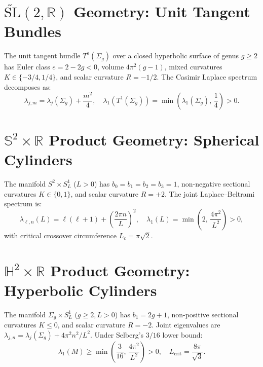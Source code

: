\documentclass[11pt,a4paper]{article}
\begin{document}
\section{$\widetilde{\mathrm{SL}}(2, \mathbb{R})$ Geometry: Unit Tangent Bundles}
The unit tangent bundle $T^1(\Sigma_g)$ over a closed hyperbolic surface of genus $g \ge 2$ has Euler class $e = 2-2g < 0$, volume $4\pi^2(g-1)$, mixed curvatures $K \in \{-3/4, 1/4\}$, and scalar curvature $R = -1/2$. The Casimir Laplace spectrum decomposes as:
\begin{equation}
\lambda_{j,m} = \lambda_j(\Sigma_g) + \frac{m^2}{4}, \quad \lambda_1(T^1(\Sigma_g)) = \min\left(\lambda_1(\Sigma_g), \, \frac{1}{4}\right) > 0.
\end{equation}

\section{$\mathbb{S}^2 \times \mathbb{R}$ Product Geometry: Spherical Cylinders}
The manifold $S^2 \times S^1_L$ ($L > 0$) has $b_0=b_1=b_2=b_3=1$, non-negative sectional curvatures $K \in \{0, 1\}$, and scalar curvature $R = +2$. The joint Laplace--Beltrami spectrum is:
\begin{equation}
\lambda_{\ell,n}(L) = \ell(\ell+1) + \left(\frac{2\pi n}{L}\right)^2, \quad \lambda_1(L) = \min\left(2, \, \frac{4\pi^2}{L^2}\right) > 0,
\end{equation}
with critical crossover circumference $L_c = \pi\sqrt{2}$.

\section{$\mathbb{H}^2 \times \mathbb{R}$ Product Geometry: Hyperbolic Cylinders}
The manifold $\Sigma_g \times S^1_L$ ($g \ge 2, L > 0$) has $b_1 = 2g+1$, non-positive sectional curvatures $K \le 0$, and scalar curvature $R = -2$. Joint eigenvalues are $\lambda_{j,n} = \lambda_j(\Sigma_g) + 4\pi^2 n^2 / L^2$. Under Selberg's $3/16$ lower bound:
\begin{equation}
\lambda_1(M) \ge \min\left(\frac{3}{16}, \, \frac{4\pi^2}{L^2}\right) > 0, \quad L_{\mathrm{crit}} = \frac{8\pi}{\sqrt{3}}.
\end{equation}
\end{document}
